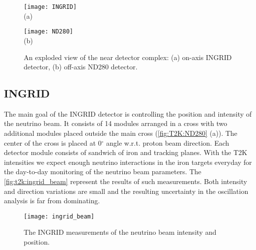 \documentclass[../main.tex]{subfiles}
\begin{document}
\begin{figure}[h!]
  \centering
  \begin{minipage}{0.49\linewidth}
    \centering
    \texttt{[image: INGRID]} \\ (a)
  \end{minipage}
  \begin{minipage}{0.49\linewidth}
    \centering
    \texttt{[image: ND280]} \\ (b)
  \end{minipage}
    \caption{An exploded view of the near detector complex: (a) on-axis INGRID detector, (b) off-axis ND280 detector.}
    \label{fig:T2K:ND280}
\end{figure}

\subsection {INGRID}
The main goal of the INGRID detector is controlling the position and intensity of the neutrino beam. It consists of 14 modules arranged in a cross with two additional modules placed outside the main cross (\autoref{fig:T2K:ND280} (a)). The center of the cross is placed at 0$^\circ$ angle w.r.t. proton beam direction. Each detector module consists of sandwich of iron and tracking planes. With the T2K intensities we expect enough neutrino interactions in the iron targets everyday for the day-to-day monitoring of the neutrino beam parameters. The \autoref{fig:t2k:ingrid_beam} represent the results of such measurements. Both intensity and direction variations are small and the resulting uncertainty in the oscillation analysis is far from dominating.

\begin{figure}
  \centering
  \texttt{[image: ingrid\_beam]}
  \caption{The INGRID measurements of the neutrino beam intensity and position.}
  \label{fig:t2k:ingrid_beam}
\end{figure}
\end{document}
